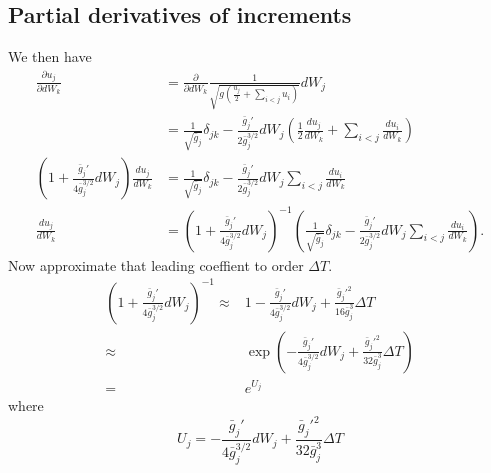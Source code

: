 \subsection{Partial derivatives of increments}
We then have 
\begin{align}
\frac{\partial u_j}{\partial dW_k} &= \frac{\partial}{\partial dW_k}\frac{1}{\sqrt{g\left(\frac{u_j}{2} +\sum_{i<j}u_i\right)}}dW_j\\
&= \frac{1}{\sqrt{\bar{g}_j}}\delta_{jk} -\frac{\bar{g}_j'}{2\bar{g}^{3/2}_j}dW_j\left(\frac{1}{2}\frac{du_j}{dW_k} + \sum_{i<j}\frac{d u_i}{dW_k}\right)\\
\left(1 + \frac{\bar{g}_j'}{4\bar{g}^{3/2}_j}dW_j\right)\frac{du_j}{dW_k} &= \frac{1}{\sqrt{\bar{g}_j}}\delta_{jk} -\frac{\bar{g}_j'}{2\bar{g}^{3/2}_j}dW_j\sum_{i<j}\frac{d u_i}{dW_k}\\
\frac{du_j}{dW_k} &= \left(1 + \frac{\bar{g}_j'}{4\bar{g}^{3/2}_j}dW_j\right)^{-1}\left(\frac{1}{\sqrt{\bar{g}_j}}\delta_{jk} -\frac{\bar{g}_j'}{2\bar{g}^{3/2}_j}dW_j\sum_{i<j}\frac{d u_i}{dW_k}\right).
\end{align}
Now approximate that leading coeffient to order $\Delta T$.  
\begin{align}
\left(1 + \frac{\bar{g}_j'}{4\bar{g}^{3/2}_j}dW_j\right)^{-1} \approx& 1 - \frac{\bar{g}_j'}{4\bar{g}_j^{3/2} }dW_j + \frac{\bar{g}_j'^2}{16 \bar{g}_j^3}\Delta T\\
\approx& \exp\left(-\frac{\bar{g}_j'}{4\bar{g}_j^{3/2} }dW_j+ \frac{\bar{g}_j'^2}{32 \bar{g}_j^3}\Delta T\right) \\
=& e^{U_j}\label{eq:defn_exp_U}
\end{align}
where 
\begin{equation}
U_j = -\frac{\bar{g}_j'}{4\bar{g}_j^{3/2} }dW_j+ \frac{\bar{g}_j'^2}{32 \bar{g}_j^3}\Delta T
\end{equation}
